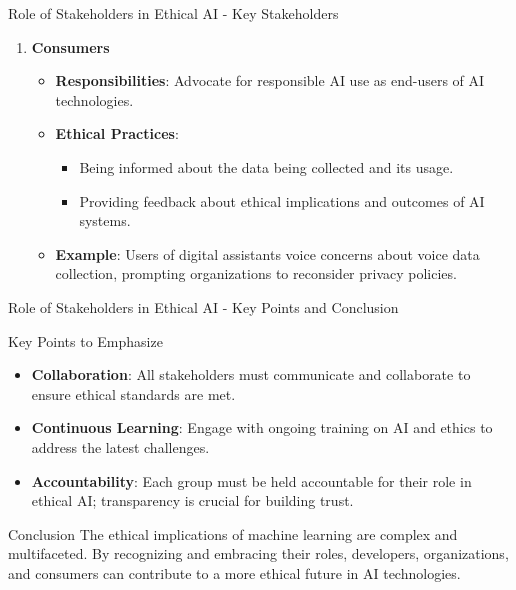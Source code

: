 \documentclass[aspectratio=169]{beamer}
\begin{document}
\begin{frame}[fragile]{Role of Stakeholders in Ethical AI - Key Stakeholders}
\begin{enumerate}
        \item \textbf{Consumers}
            \begin{itemize}
                \item \textbf{Responsibilities}: Advocate for responsible AI use as end-users of AI technologies.
                \item \textbf{Ethical Practices}:
                    \begin{itemize}
                        \item Being informed about the data being collected and its usage.
                        \item Providing feedback about ethical implications and outcomes of AI systems.
                    \end{itemize}
                \item \textbf{Example}: Users of digital assistants voice concerns about voice data collection, prompting organizations to reconsider privacy policies.
            \end{itemize}
    \end{enumerate}
\end{frame}

\begin{frame}[fragile]{Role of Stakeholders in Ethical AI - Key Points and Conclusion}
    \begin{block}{Key Points to Emphasize}
        \begin{itemize}
            \item \textbf{Collaboration}: All stakeholders must communicate and collaborate to ensure ethical standards are met.
            \item \textbf{Continuous Learning}: Engage with ongoing training on AI and ethics to address the latest challenges.
            \item \textbf{Accountability}: Each group must be held accountable for their role in ethical AI; transparency is crucial for building trust.
        \end{itemize}
    \end{block}
    
    \begin{block}{Conclusion}
        The ethical implications of machine learning are complex and multifaceted. By recognizing and embracing their roles, developers, organizations, and consumers can contribute to a more ethical future in AI technologies.
    \end{block}
\end{frame}
\end{document}
